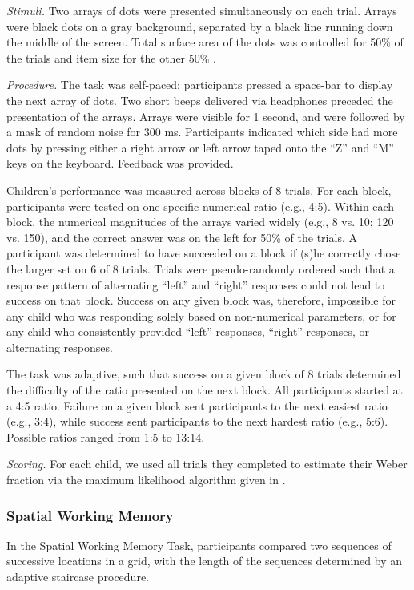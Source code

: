 \documentclass[11pt]{article}
\begin{document}
{\it Stimuli.} Two arrays of dots were presented simultaneously on each trial. Arrays were black dots on a gray background, separated by a black line running down the middle of the screen. Total surface area of the dots was controlled for 50\% of the trials and item size for the other 50\% \cite{dehaene2005}.

{\it Procedure.} The task was self-paced: participants pressed a space-bar to display the next array of dots. Two short beeps delivered via headphones preceded the presentation of the arrays. Arrays were visible for 1 second, and were followed by a mask of random noise for 300 ms. Participants indicated which side had more dots by pressing either a right arrow or left arrow taped onto the ``Z'' and ``M'' keys on the keyboard. Feedback was provided.

Children's performance was measured across blocks of 8 trials. For each block, participants were tested on one specific numerical ratio (e.g., 4:5). Within each block, the numerical magnitudes of the arrays varied widely (e.g., 8 vs. 10; 120 vs. 150), and the correct answer was on the left for 50\% of the trials. A participant was determined to have succeeded on a block if (s)he correctly chose the larger set on 6 of 8 trials. Trials were pseudo-randomly ordered such that a response pattern of alternating ``left'' and ``right'' responses could not lead to success on that block. Success on any given block was, therefore, impossible for any child who was responding solely based on non-numerical parameters, or for any child who consistently provided ``left'' responses, ``right'' responses, or alternating responses.

The task was adaptive, such that success on a given block of 8 trials determined the difficulty of the ratio presented on the next block. All participants started at a 4:5 ratio. Failure on a given block sent participants to the next easiest ratio (e.g., 3:4), while success sent participants to the next hardest ratio (e.g., 5:6). Possible ratios ranged from 1:5 to 13:14.

{\it Scoring.} For each child, we used all trials they completed to estimate their Weber fraction via the maximum likelihood algorithm given in .

\subsubsection{Spatial Working Memory}

In the Spatial Working Memory Task, participants compared two sequences of successive locations in a grid, with the length of the sequences determined by an adaptive staircase procedure.
\end{document}
